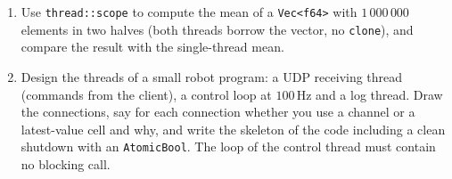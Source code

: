 \begin{enumerate}[label=\textbf{\thechapter.\arabic*}]
  \item Use \verb!thread::scope! to compute the mean of a \verb!Vec<f64>! with $1\,000\,000$ elements in two halves (both threads borrow the vector, no \verb!clone!), and compare the result with the single-thread mean.
  \item[\textbf{\thechapter.10}$\star$] Design the threads of a small robot program: a UDP receiving thread (commands from the client), a control loop at $100$\,Hz and a log thread. Draw the connections, say for each connection whether you use a channel or a latest-value cell and why, and write the skeleton of the code including a clean shutdown with an \verb!AtomicBool!. The loop of the control thread must contain no blocking call.
\end{enumerate}
